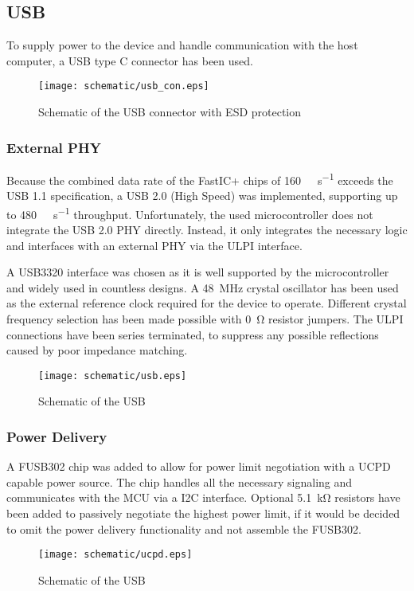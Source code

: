 \subsection{USB}
To supply power to the device and handle communication with the host computer, a USB type C connector has been used.
\FloatBarrier
\begin{figure}[htp!]
    \centering
    \texttt{[image: schematic/usb\_con.eps]}
    \caption{Schematic of the USB connector with ESD protection}
    \label{fig:fastic_triggers}
\end{figure}
\FloatBarrier
\subsubsection{External PHY}
Because the combined data rate of the FastIC+ chips of \SI{160}{\mega\bit\per\second} exceeds the USB 1.1 specification, a USB 2.0 (High Speed) was implemented, supporting up to \SI{480}{\mega\bit\per\second} throughput. Unfortunately, the used microcontroller does not integrate the USB 2.0 PHY directly. Instead, it only integrates the necessary logic and interfaces with an external PHY via the ULPI interface. 


A USB3320 interface was chosen as it is well supported by the microcontroller and widely used in countless designs. A \SI{48}{\mega\hertz} crystal oscillator has been used as the external reference clock required for the device to operate. Different crystal frequency selection has been made possible with \SI{0}{\ohm} resistor jumpers. The ULPI connections have been series terminated, to suppress any possible reflections caused by poor impedance matching. 
\FloatBarrier
\begin{figure}[htp!]
    \centering
    \texttt{[image: schematic/usb.eps]}
    \caption{Schematic of the USB}
    \label{fig:fastic_triggers}
\end{figure}
\FloatBarrier
\subsubsection{Power Delivery}
A FUSB302 chip was added to allow for power limit negotiation with a UCPD capable power source. The chip handles all the necessary signaling and communicates with the MCU via a I2C interface. Optional \SI{5.1}{\kilo\ohm} resistors have been added to passively negotiate the highest power limit, if it would be decided to omit the power delivery functionality and not assemble the FUSB302.
\FloatBarrier
\begin{figure}[htp!]
    \centering
    \texttt{[image: schematic/ucpd.eps]}
    \caption{Schematic of the USB}
    \label{fig:fastic_triggers}
\end{figure}
\FloatBarrier
